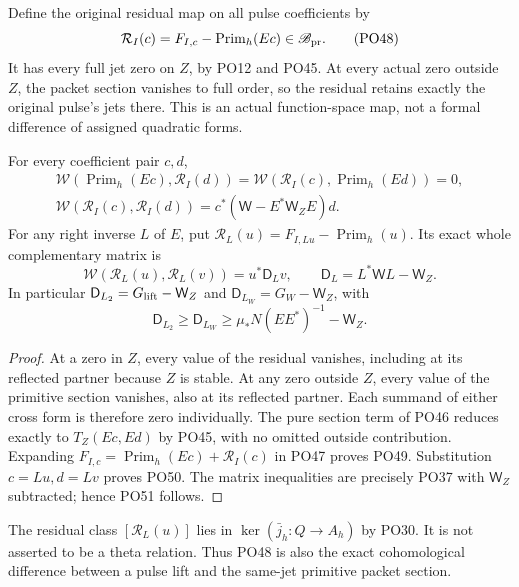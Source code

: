 Define the original residual map on all pulse coefficients by
\[
 \mathcal R_I(c)=F_{I,c}-\operatorname{Prim}_h(Ec)\in\mathscr B_{\rm pr}.
 \tag{PO48}\label{PO:po:residual}
\]
It has every full jet zero on \(Z\), by PO12 and PO45.
At every actual zero outside \(Z\), the packet section vanishes
to full order, so the residual retains exactly the original
pulse's jets there. This is an actual function-space map,
not a formal difference of assigned quadratic forms.

\begin{theorem}
\label{PO:thm:residual}
For every coefficient pair \(c,d\),
\[
 \begin{gathered}
 \mathcal W(\operatorname{Prim}_h(Ec),\mathcal R_I(d))
 =\mathcal W(\mathcal R_I(c),\operatorname{Prim}_h(Ed))=0,\\
 \mathcal W(\mathcal R_I(c),\mathcal R_I(d))
      =c^*(\mathsf W-E^*\mathsf W_ZE)d .
 \end{gathered}
 \tag{PO49}\label{PO:po:orthogonal}
\]
For any right inverse \(L\) of \(E\), put
\(\mathcal R_L(u)=F_{I,Lu}-\operatorname{Prim}_h(u)\).
Its exact whole complementary matrix is
\[
 \mathcal W(\mathcal R_L(u),\mathcal R_L(v))
       =u^*\mathsf D_Lv,\qquad
 \boxed{\mathsf D_L=L^*\mathsf W L-\mathsf W_Z.}
 \tag{PO50}\label{PO:po:complement}
\]
In particular
\(\mathsf D_{L_2}=G_{\rm lift}-\mathsf W_Z\) and
\(\mathsf D_{L_W}=G_W-\mathsf W_Z\), with
\[
 \mathsf D_{L_2}\ge\mathsf D_{L_W}
       \ge\mu_*N(EE^*)^{-1}-\mathsf W_Z .
 \tag{PO51}\label{PO:po:residual-lower}
\]
\end{theorem}
\begin{proof}
At a zero in \(Z\), every value of the residual vanishes,
including at its reflected partner because \(Z\) is stable.
At any zero outside \(Z\), every value of the primitive section
vanishes, also at its reflected partner.
Each summand of either cross form is therefore zero individually.
The pure section term of PO46 reduces exactly to \(T_Z(Ec,Ed)\)
by PO45, with no omitted outside contribution.
Expanding \(F_{I,c}=\operatorname{Prim}_h(Ec)+\mathcal R_I(c)\)
in PO47 proves PO49. Substitution \(c=Lu,d=Lv\) proves PO50.
The matrix inequalities are precisely PO37 with
\(\mathsf W_Z\) subtracted; hence PO51 follows.
\end{proof}

The residual class \([\mathcal R_L(u)]\) lies in
\(\ker(\bar j_h:Q\to A_h)\) by PO30.
It is not asserted to be a theta relation. Thus PO48 is also
the exact cohomological difference between a pulse lift and
the same-jet primitive packet section.

